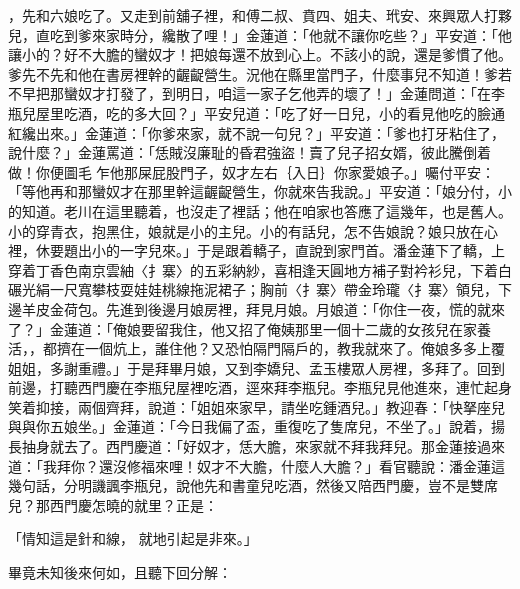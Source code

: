 ，先和六娘吃了。又走到前舖子裡，和傅二叔、賁四、姐夫、玳安、來興眾人打夥兒，直吃到爹來家時分，纔散了哩！」金蓮道：「他就不讓你吃些？」平安道：「他讓小的？好不大膽的蠻奴才！把娘每還不放到心上。不該小的說，還是爹慣了他。爹先不先和他在書房裡幹的齷齪營生。況他在縣里當門子，什麼事兒不知道！爹若不早把那蠻奴才打發了，到明日，咱這一家子乞他弄的壞了！」金蓮問道：「在李瓶兒屋里吃酒，吃的多大回？」平安兒道：「吃了好一日兒，小的看見他吃的臉通紅纔出來。」金蓮道：「你爹來家，就不說一句兒？」平安道：「爹也打牙粘住了，說什麼？」金蓮罵道：「恁賊沒廉耻的昏君強盜！賣了兒子招女婿，彼此騰倒着做！你便圖毛乍他那屎屁股門子，奴才左右｛入日｝你家愛娘子。」囑付平安：「等他再和那蠻奴才在那里幹這齷齪營生，你就來告我說。」平安道：「娘分付，小的知道。老川在這里聽着，也沒走了裡話；他在咱家也答應了這幾年，也是舊人。小的穿青衣，抱黑住，娘就是小的主兒。小的有話兒，怎不告娘說？娘只放在心裡，休要題出小的一字兒來。」于是跟着轎子，直說到家門首。潘金蓮下了轎，上穿着丁香色南京雲紬〈扌寨〉的五彩納紗，喜相逢天圓地方補子對衿衫兒，下着白碾光絹一尺寬攀枝耍娃娃桃線拖泥裙子；胸前〈扌寨〉帶金玲瓏〈扌寨〉領兒，下邊羊皮金荷包。先進到後邊月娘房裡，拜見月娘。月娘道：「你住一夜，慌的就來了？」金蓮道：「俺娘要留我住，他又招了俺姨那里一個十二歲的女孩兒在家養活，，都擠在一個炕上，誰住他？又恐怕隔門隔戶的，教我就來了。俺娘多多上覆姐姐，多謝重禮。」于是拜畢月娘，又到李嬌兒、孟玉樓眾人房裡，多拜了。回到前邊，打聽西門慶在李瓶兒屋裡吃酒，逕來拜李瓶兒。李瓶兒見他進來，連忙起身笑着抑接，兩個齊拜，說道：「姐姐來家早，請坐吃鍾酒兒。」教迎春：「快拏座兒與與你五娘坐。」金蓮道：「今日我偏了盃，重復吃了隻席兒，不坐了。」說着，揚長抽身就去了。西門慶道：「好奴才，恁大膽，來家就不拜我拜兒。那金蓮接過來道：「我拜你？還沒修福來哩！奴才不大膽，什麼人大膽？」看官聽說：潘金蓮這幾句話，分明譏諷李瓶兒，說他先和書童兒吃酒，然後又陪西門慶，豈不是雙席兒？那西門慶怎曉的就里？正是：

「情知這是針和線，  就地引起是非來。」

畢竟未知後來何如，且聽下回分解：


